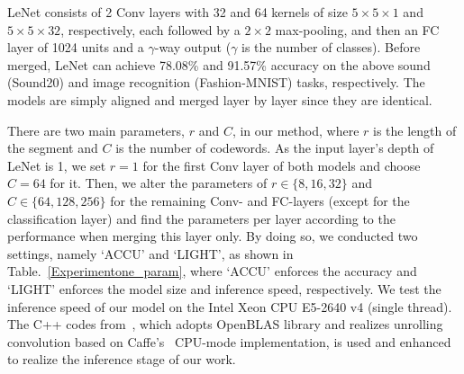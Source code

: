 \documentclass{article}
\begin{document}
	\begin{comment}
	\begin{table}[t]
	\centering
	\small
	\caption{Compression ratio, Speedup, and Accuracy drop of sound and image merged model. The speedup ratio is tested on both Intel and ARM device. One is the CPU of Intel(R) Xeon(R) CPU E5-2640 v4, and the other is CPU of NVIDIA Jetson TX1. ``$a/b$" in the Speedup field denotes the speedup ratio using different CPUs.%
	}
	\label{LeNetMerge}
	\begin{tabular}{lcccc}
	\toprule
	Para.   & Compr.      & Speedup                 & Sound $\downarrow$            & Image $\downarrow$  \\ \hline
	ACCU       & 10.4 $\times$   & 1.3$/$4.2 $\times$     & -0.06\%                   & 0.68\%      \\
	LIGHT       & 15.3 $\times$   & 1.8$/$6.2 $\times$    & 0.76\%                    & 1.40\%     \\
	\bottomrule
	\end{tabular}
	\end{table}
	\end{comment}
	
	LeNet consists of 2 Conv layers with 32 and 64 kernels of size $5 \times 5 \times 1$ and $5 \times 5 \times 32$, respectively, each followed by a $2\times 2$ max-pooling, and then an FC layer of 1024 units and a $\gamma$-way output ($\gamma$ is the number of classes).
	Before merged, LeNet can achieve 78.08\% and 91.57\% accuracy on the above sound (Sound20) and image recognition (Fashion-MNIST) tasks, respectively.
	The models are simply aligned and merged layer by layer since they are identical.
	
	There are two main parameters, $r$ and $C$, in our method, where $r$ is the length of the segment and $C$ is the number of codewords.
	As the input layer's depth of LeNet is 1, we set $r=1$ for the first Conv layer of both models and choose $C=64$ for it.
	Then, we alter the parameters of $r \in \{8, 16, 32\}$ and $C \in \{64, 128, 256\}$ for the remaining Conv- and FC-layers (except for the classification layer) and find the parameters per layer according to the performance when merging this layer only.
	By doing so, we conducted two settings, namely `ACCU' and `LIGHT', as shown in Table.~\ref{Experimentone_param}, where `ACCU' enforces the accuracy and `LIGHT' enforces the model size and inference speed, respectively.
	We test the inference speed of our model on %
	the Intel Xeon CPU E5-2640 v4 (single thread). %
	The C++ codes from~\cite{Wu16}, which adopts OpenBLAS library and realizes unrolling convolution based on Caffe's~\cite{jia2014caffe} CPU-mode implementation, is used and enhanced to realize the inference stage of our work.
	
\end{document}

